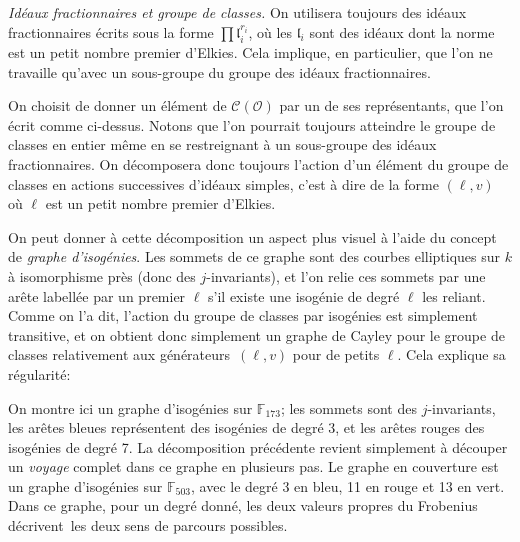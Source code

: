 \documentclass[11pt,a4paper]{article}
\newcommand{\F}{\mathbb{F}}
\renewcommand{\O}{\mathcal{O}}
\newcommand{\Cl}{\mathcal{C}}
\renewcommand{\frak}{\mathfrak}
\theoremstyle{definition}
\begin{document}
\emph{Idéaux fractionnaires et groupe de classes.} On utilisera toujours des idéaux fractionnaires écrits sous la forme $\prod {\frak l}_i^{r_i}$, où les ${\frak l}_i$ sont des idéaux dont la norme est un petit nombre premier d'Elkies. Cela implique, en particulier, que l'on ne travaille qu'avec un sous-groupe du groupe des idéaux fractionnaires.

On choisit de donner un élément de $\Cl(\O)$ par un de ses représentants, que l'on écrit comme ci-dessus. Notons que l'on pourrait toujours atteindre le groupe de classes en entier même en se restreignant à un sous-groupe des idéaux fractionnaires. On décomposera donc toujours l'action d'un élément du groupe de classes en actions successives d'idéaux \og simples\fg, c'est à dire de la forme $(\ell, v)$ où $\ell$ est un petit nombre premier d'Elkies.

On peut donner à cette décomposition un aspect plus visuel à l'aide du concept de \emph{graphe d'isogénies}. Les sommets de ce graphe sont des courbes elliptiques sur $k$ à isomorphisme près (donc des $j$-invariants), et l'on relie ces sommets par une arête labellée par un premier $\ell$ s'il existe une isogénie de degré $\ell$ les reliant. Comme on l'a dit, l'action du groupe de classes par isogénies est simplement transitive, et on obtient donc simplement un graphe de Cayley pour le groupe de classes relativement aux \og générateurs\fg\ $(\ell, v)$ pour de petits $\ell$. Cela explique sa régularité:

\begin{center}
\end{center}


On montre ici un graphe d'isogénies sur $\F_{173}$; les sommets sont des $j$-invariants, les arêtes bleues représentent des isogénies de degré 3, et les arêtes rouges des isogénies de degré 7. La décomposition précédente revient simplement à découper un \emph{voyage} complet dans ce graphe en plusieurs pas. Le graphe en couverture est un graphe d'isogénies sur $\F_{503}$, avec le degré 3 en bleu, 11 en rouge et 13 en vert. Dans ce graphe, pour un degré donné, les deux valeurs propres du Frobenius \og décrivent\fg\ les deux sens de parcours possibles.
\end{document}
